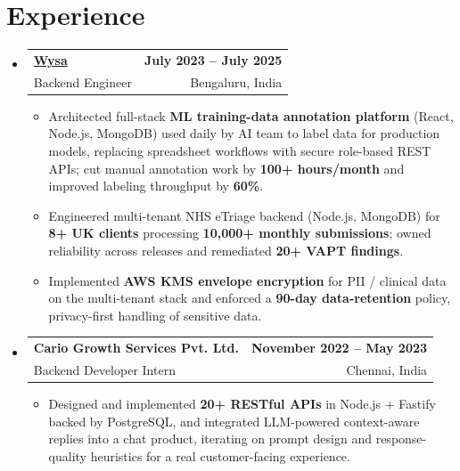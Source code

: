 \documentclass[letterpaper,10pt]{article}
\makeatletter
\newcommand{\resumeItem}[1]{
  \item\small{#1\vspace{-1pt}}
}
\newcommand{\resumeSubheading}[4]{
  \vspace{1pt}\item
    \begin{tabular*}{0.985\textwidth}[t]{l@{\extracolsep{\fill}}r}
      \textbf{#1} & \textbf{\small #2} \\
      {\small\color{ResumeSlate} #3} & {\small\color{ResumeSlate} #4} \\
    \end{tabular*}\vspace{-6pt}
}
\newcommand{\resumeSubHeadingListStart}{\begin{itemize}[leftmargin=0.0in, label={}, itemsep=2pt, topsep=2pt]}
\newcommand{\resumeSubHeadingListEnd}{\end{itemize}}
\newcommand{\resumeItemListStart}{\begin{itemize}[leftmargin=0.18in, itemsep=2pt, topsep=1pt]}
\newcommand{\resumeItemListEnd}{\end{itemize}\vspace{-4pt}}
\makeatother
\begin{document}
\section{Experience}
\resumeSubHeadingListStart
  \resumeSubheading
    {\href{https://www.wysa.io}{Wysa}}{July 2023 -- July 2025}
    {Backend Engineer}{Bengaluru, India}
    \resumeItemListStart
      \resumeItem{Architected full-stack \textbf{ML training-data annotation platform} (React, Node.js, MongoDB) used daily by AI team to label data for production models, replacing spreadsheet workflows with secure role-based REST APIs; cut manual annotation work by \textbf{100+ hours/month} and improved labeling throughput by \textbf{60\%}.}
      \resumeItem{Engineered multi-tenant NHS eTriage backend (Node.js, MongoDB) for \textbf{8+ UK clients} processing \textbf{10{,}000+ monthly submissions}; owned reliability across releases and remediated \textbf{20+ VAPT findings}.}
      \resumeItem{Implemented \textbf{AWS KMS envelope encryption} for PII / clinical data on the multi-tenant stack and enforced a \textbf{90-day data-retention} policy, privacy-first handling of sensitive data.}
    \resumeItemListEnd
  \resumeSubheading
    {Cario Growth Services Pvt. Ltd.}{November 2022 -- May 2023}
    {Backend Developer Intern}{Chennai, India}
    \resumeItemListStart
      \resumeItem{Designed and implemented \textbf{20+ RESTful APIs} in Node.js + Fastify backed by PostgreSQL, and integrated LLM-powered context-aware replies into a chat product, iterating on prompt design and response-quality heuristics for a real customer-facing experience.}
    \resumeItemListEnd
\resumeSubHeadingListEnd
\vspace{-4pt}
\end{document}
